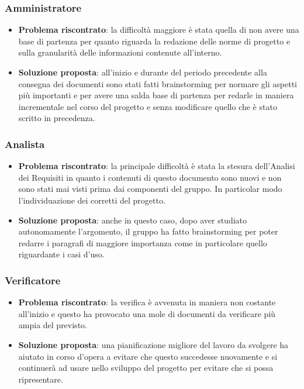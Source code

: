 		\subsubsection{Amministratore}
			\begin{itemize}
				\item \textbf{Problema riscontrato}: la difficoltà maggiore è stata quella di non avere una base di partenza per quanto riguarda la redazione delle norme di progetto e sulla granularità delle informazioni contenute all'interno.
				\item \textbf{Soluzione proposta}: all'inizio e durante del periodo precedente alla consegna dei documenti sono stati fatti brainstorming per normare gli aspetti più importanti e per avere una salda base di partenza per redarle in maniera incrementale nel corso del progetto e senza modificare quello che è stato scritto in precedenza.
			\end{itemize}

		\subsubsection{Analista}
			\begin{itemize}
				\item \textbf{Problema riscontrato}: la principale difficoltà è stata la stesura dell'Analisi dei Requisiti in quanto i contenuti di questo documento sono nuovi e non sono stati mai visti prima dai componenti del gruppo. In particolar modo l'individuazione dei corretti  del progetto.
				\item \textbf{Soluzione proposta}: anche in questo caso, dopo aver studiato autonomamente l'argomento, il gruppo ha fatto brainstorming per poter redarre i paragrafi di maggiore importanza come in particolare quello riguardante i casi d'uso.
			\end{itemize}

		\subsubsection{Verificatore}
			\begin{itemize}
				\item \textbf{Problema riscontrato}: la verifica è avvenuta in maniera non costante all'inizio e questo ha provocato una mole di documenti da verificare più ampia del previsto.
				\item \textbf{Soluzione proposta}: una pianificazione migliore del lavoro da svolgere ha aiutato in corso d'opera a evitare che questo succedesse nuovamente e si continuerà ad usare nello sviluppo del progetto per evitare che si possa ripresentare.
			\end{itemize}

